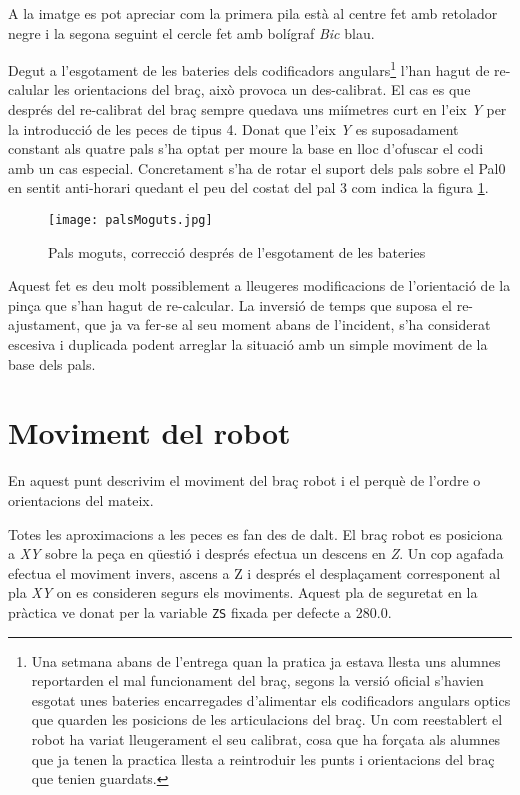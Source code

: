 A la imatge es pot apreciar com la primera pila està al centre fet amb
retolador negre i la segona seguint el cercle fet amb bolígraf \emph{Bic} blau.

Degut a l'esgotament de les bateries dels codificadors
angulars\footnote{Una setmana abans de l'entrega quan la pratica ja estava llesta uns
alumnes reportarden el mal funcionament del braç, segons la versió oficial
s'havien esgotat unes bateries encarregades d'alimentar els codificadors angulars
optics que quarden les posicions de les articulacions del braç. Un com reestablert el robot
ha variat lleugerament el seu calibrat, cosa que ha forçata als alumnes que ja tenen la practica
llesta a reintroduir les punts i orientacions del braç que tenien guardats.} 
l'han hagut de re-calular les orientacions del braç, això provoca un
des-calibrat. El cas es que després del re-calibrat
del braç sempre quedava uns mi\lgem ímetres curt en l'eix \emph{Y}
per la introducció de les peces de tipus 4. Donat que l'eix \emph{Y}
es suposadament constant als quatre pals s'ha optat per moure la base en lloc d'ofuscar
el codi amb un cas especial. Concretament s'ha de rotar el suport dels
pals sobre el Pal0 en sentit anti-horari quedant el peu del costat del pal 3
com indica la figura \ref{figpalmog}. 

\begin{figure}[H]
\begin{center}\label{figpalmog}
 \texttt{[image: palsMoguts.jpg]}
\end{center}
  \caption{Pals moguts, correcció després de l'esgotament de les bateries}
\end{figure}

Aquest fet es deu molt possiblement a lleugeres modificacions de l'orientació de la pinça
que s'han hagut de re-calcular. La inversió de temps que suposa el re-ajustament, que ja va
fer-se al seu moment abans de l'incident, s'ha considerat escesiva i duplicada podent arreglar
la situació amb un simple moviment de la base dels pals.

\section{Moviment del robot}
En aquest punt descrivim el moviment del braç robot i el perquè de l'ordre o
orientacions del mateix.

Totes les aproximacions a les peces es fan des de dalt. El braç robot es
posiciona a \emph{XY} sobre la peça en qüestió i després efectua un descens en \emph{Z}. Un
cop agafada efectua el moviment invers, ascens a Z i després el desplaçament
corresponent al pla \emph{XY} on es consideren segurs els moviments. Aquest pla de
seguretat en la pràctica ve donat per la variable \texttt{ZS} fixada per
defecte a 280.0.

